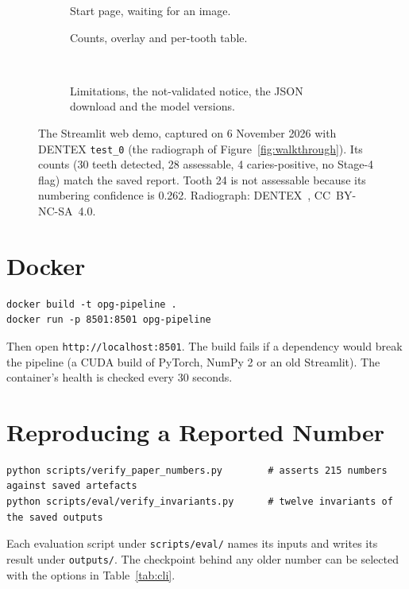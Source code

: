 \begin{figure}[!htbp]
\centering
\begin{subfigure}[b]{0.49\textwidth}
\caption{Start page, waiting for an image.}
\end{subfigure}\hfill
\begin{subfigure}[b]{0.49\textwidth}
\caption{Counts, overlay and per-tooth table.}
\end{subfigure}\\[3mm]
\begin{subfigure}[b]{0.72\textwidth}
\caption{Limitations, the not-validated notice, the JSON download and the model versions.}
\end{subfigure}
\caption[The web demo]{The Streamlit web demo, captured on 6 November 2026 with DENTEX
\texttt{test\_0} (the radiograph of Figure~\ref{fig:walkthrough}). Its counts (30 teeth detected, 28
assessable, 4 caries-positive, no Stage-4 flag) match the saved report. Tooth 24 is not assessable
because its numbering confidence is 0.262. Radiograph: DENTEX~\cite{hamamci2023dentex},
CC~BY-NC-SA~4.0.}
\label{fig:app}
\end{figure}

\section{Docker}

\begin{lstlisting}
docker build -t opg-pipeline .
docker run -p 8501:8501 opg-pipeline
\end{lstlisting}
Then open \texttt{http://localhost:8501}. The build fails if a dependency would break the pipeline (a
CUDA build of PyTorch, NumPy 2 or an old Streamlit). The container's health is checked every 30 seconds.

\section{Reproducing a Reported Number}

\begin{lstlisting}
python scripts/verify_paper_numbers.py        # asserts 215 numbers against saved artefacts
python scripts/eval/verify_invariants.py      # twelve invariants of the saved outputs
\end{lstlisting}
Each evaluation script under \texttt{scripts/eval/} names its inputs and writes its result under
\texttt{outputs/}. The checkpoint behind any older number can be selected with the options in
Table~\ref{tab:cli}.

